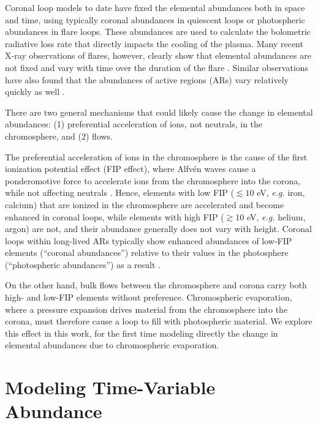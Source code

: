 \documentclass[twocolumn]{aastex631}
\begin{document}
Coronal loop models to date have fixed the elemental abundances both in space and time, using typically coronal abundances in quiescent loops or photospheric abundances in flare loops.  These abundances are used to calculate the bolometric radiative loss rate that directly impacts the cooling of the plasma.  Many recent X-ray observations of flares, however, clearly show that elemental abundances are not fixed and vary with time over the duration of the flare \citep{mondal2021, delzanna2021, mithun2022, nama2023, suarez2023, woods2023, rao2023, kepa2023}.  Similar observations have also found that the abundances of active regions (ARs) vary relatively quickly as well \citep{mondal2023}. 

There are two general mechanisms that could likely cause the change in elemental abundances: (1) preferential acceleration of ions, not neutrals, in the chromosphere, and (2) flows.  

The preferential acceleration of ions in the chromosphere is the cause of the first ionization potential effect (FIP effect), where Alfv\'en waves cause a ponderomotive force to accelerate ions from the chromosphere into the corona, while not affecting neutrals \citep{laming2015,laming2021}.  Hence, elements with low FIP ($\lesssim 10$ eV, \textit{e.g.} iron, calcium) that are ionized in the chromosphere are accelerated and become enhanced in coronal loops, while elements with high FIP ($\gtrsim 10$ eV, \textit{e.g.} helium, argon) are not, and their abundance generally does not vary with height.  Coronal loops within long-lived ARs typically show enhanced abundances of low-FIP elements (``coronal abundances'') relative to their values in the photosphere (``photospheric abundances'') as a result \citep{pottasch1964,mckenzie1992,delzanna2003,delzanna2014}.  

On the other hand, bulk flows between the chromosphere and corona carry both high- and low-FIP elements without preference.  Chromospheric evaporation, where a pressure expansion drives material from the chromosphere into the corona, must therefore cause a loop to fill with photospheric material.  We explore this effect in this work, for the first time modeling directly the change in elemental abundances due to chromospheric evaporation.  

\section{Modeling Time-Variable Abundance}
\end{document}
